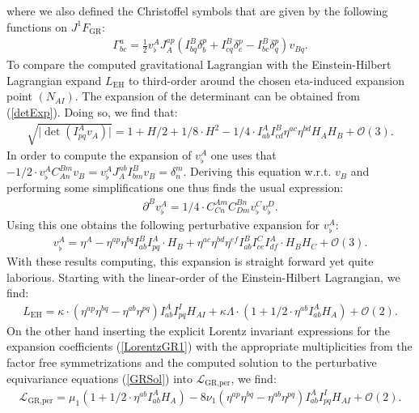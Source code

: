 where we also defined the Christoffel symbols that are given by the following functions on $J^1F_{\text{GR}}$:
\begin{align}
\Gamma^a_{bc} = \frac{1}{2} v_{\flat}^A J_A^{ap} \left ( I^B_{bq}\delta^p_b + I^B_{cq}\delta^p_c - I^B_{bc}\delta^p_q  \right ) v_{Bq}.
\end{align}
To compare the computed gravitational Lagrangian with the Einstein-Hilbert Lagrangian expand $L_{\text{EH}}$ to third-order around the chosen eta-induced expansion point $(N_{AI})$. The expansion of the determinant can be obtained from (\ref{detExp}). Doing so, we find that:
\begin{align}
   \sqrt{\vert \operatorname{det} \left ( I^A_{pq}v_A \right ) \vert } = 1 + H/2 +1/8 \cdot H^2 - 1/4 \cdot I^A_{ab}I^B_{cd} \eta^{ac} \eta^{bd} H_A H_B + \mathcal{O}(3).   
\end{align}
In order to compute the expansion of $v^A_{\flat}$ one uses that $-1/2 \cdot v_{\flat}^AC_{An}^{Bm}v_B = v_{\flat}^A J_A^{nb}I^B_{bm}v_B = \delta^m_n$. Deriving this equation w.r.t. $v_B$ and performing some simplifications one thus finds the usual expression:
\begin{align}
    \partial^Bv_{\flat}^A = 1/4 \cdot C_{Cn}^{Am}C_{Dm}^{Bn}v_{\flat}^C v_{\flat}^{D}.
\end{align}
Using this one obtains the following perturbative expansion for $v_{\flat}^A$:
\begin{align}
    v_{\flat}^A = \eta^A - \eta^{ap}\eta^{bq} I^B_{ab} I^A_{pq} \cdot H_B + \eta^{ac}\eta^{bd}\eta^{ef} I^B_{ab} I^C_{ce} I^A_{df} \cdot H_BH_C + \mathcal{O}(3).  
\end{align}
With these results computing, this expansion is straight forward yet quite laborious.
Starting with the linear-order of the Einstein-Hilbert Lagrangian, we find:
\begin{align}
        L_{\text{EH}} = \kappa \cdot (\eta^{ap}\eta^{bq} - \eta^{ab}\eta^{pq}) I^{A}_{ab}I^{I}_{pq} H_{AI} + \kappa \Lambda \cdot (1 + 1/2 \cdot \eta^{ab} I_{ab}^A H_A) + \mathcal{O}(2).
\end{align}
On the other hand inserting the explicit Lorentz invariant expressions for the expansion coefficients (\ref{LorentzGR1}) with the appropriate multiplicities from the factor free symmetrizations and the computed solution to the perturbative equivariance equations (\ref{GRSol}) into $\mathcal{L}_{\text{GR,per}}$, we find:
\begin{align}
    \mathcal{L}_{\text{GR,per}} = \mu_1(1 + 1/2 \cdot \eta^{ab} I_{ab}^A H_A) - 8 \nu_1 \left(\eta^{ap}\eta^{bq} - \eta^{ab}\eta^{pq} \right )I^{A}_{ab}I^{I}_{pq} H_{AI} + \mathcal{O}(2).
\end{align}

